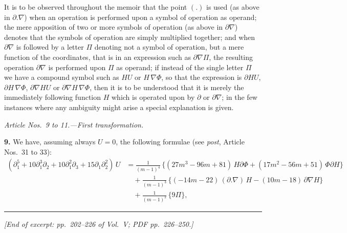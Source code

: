 \documentclass[11pt,a4paper]{article}
\begin{document}
\medskip

It is to be observed throughout the memoir that the point $(.)$ is used (as above in $\partial.\nabla$) when an operation is performed upon a symbol of operation as operand; the mere apposition of two or more symbols of operation (as above in $\partial\nabla$) denotes that the symbols of operation are simply multiplied together; and when $\partial\nabla$ is followed by a letter $\Pi$ denoting not a symbol of operation, but a mere function of the coordinates, that is in an expression such as $\partial\nabla\Pi$, the resulting operation $\partial\nabla$ is performed upon $\Pi$ as operand; if instead of the single letter $\Pi$ we have a compound symbol such as $HU$ or $H\,\nabla\Phi$, so that the expression is $\partial HU$, $\partial H\,\nabla\Phi$, $\partial\nabla HU$ or $\partial\nabla H\,\nabla\Phi$, then it is to be understood that it is merely the immediately following function $H$ which is operated upon by $\partial$ or $\partial\nabla$; in the few instances where any ambiguity might arise a special explanation is given.

\bigskip

\begin{center}
\textit{Article Nos.\ 9 to 11.---First transformation.}
\end{center}

\textbf{9.} We have, assuming always $U = 0$, the following formulae (see \textit{post}, Article Nos.\ 31 to 33):
\[
\begin{aligned}
(\partial_{1}^{5} + 10\partial_{1}^{3}\partial_{2} + 10\partial_{1}^{2}\partial_{3} + 15\partial_{1}\partial_{2}^{2})\,U
&= \frac{1}{(m - 1)^{4}}\,\bigl\{(27m^{3} - 96m + 81)\,H\partial\Phi + (17m^{2} - 56m + 51)\,\Phi\partial H\bigr\}\\
&\quad + \frac{1}{(m - 1)^{3}}\,\bigl\{(-14m - 22)\,(\partial.\nabla)\,H - (10m - 18)\,\partial\nabla H\bigr\}\\
&\quad + \frac{1}{(m - 1)^{2}}\,\bigl\{9\Pi\bigr\},
\end{aligned}
\]

\bigskip
\noindent\rule{\textwidth}{0.4pt}
\vspace{1em}

\begin{center}
\textit{[End of excerpt: pp.~202--226 of Vol.~V; PDF pp.~226--250.]}
\end{center}
\end{document}
